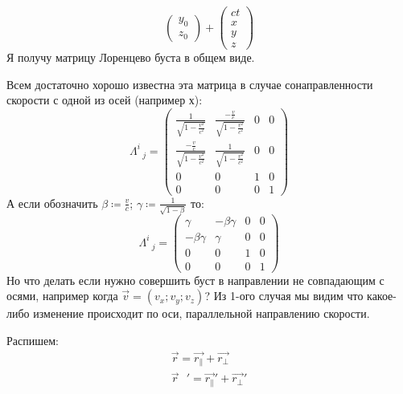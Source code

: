\documentclass[12pt]{article}
\begin{document}
\begin{large}
\begin{equation}
\begin{pmatrix}
            y_0\\
            z_0
        \end{pmatrix}
        +
        \begin{pmatrix}
            ct\\
            x\\
            y\\
            z
        \end{pmatrix}
    \end{equation}
    Я получу матрицу Лоренцево буста в общем виде.
    \par Всем достаточно хорошо известна эта матрица в случае сонаправленности скорости с одной из осей (например х):
    \begin{equation}
        \Lambda^i_{\text{ }j} =
        \begin{pmatrix}
            \frac{1}{\sqrt{1-\frac{v^2}{c^2}}} & \frac{-\frac{v}{c}}{\sqrt{1-\frac{v^2}{c^2}}} & 0 & 0 \\
            \frac{-\frac{v}{c}}{\sqrt{1-\frac{v^2}{c^2}}} & \frac{1}{\sqrt{1-\frac{v^2}{c^2}}} & 0 & 0 \\
            0 & 0 & 1 & 0 \\
            0 & 0 & 0 & 1
        \end{pmatrix}
    \end{equation}
    А если обозначить $\beta \coloneqq \frac{v}{c}$; $\gamma \coloneqq \frac{1}{\sqrt{1 - \beta}}$ то:
    \begin{equation}
        \Lambda^i_{\text{ }j} =
        \begin{pmatrix}
            \gamma & -\beta \gamma & 0 & 0 \\
            -\beta \gamma & \gamma & 0 & 0 \\
            0 & 0 & 1 & 0 \\
            0 & 0 & 0 & 1
        \end{pmatrix}
    \end{equation}
    Но что делать если нужно совершить буст в направлении не совпадающим с осями, например когда $\vec{v} = (v_x; v_y; v_z)$?
    Из 1-ого случая мы видим что какое-либо изменение происходит по оси, параллельной направлению скорости.
    \par Распишем:
    \begin{equation}
    \begin{gathered}
        \vec{r} = \vec{r_{\parallel}} + \vec{r_\perp} \\
        \vec{r}\text{ }' = \vec{r_{\parallel}}' + \vec{r_\perp}'

\end{gathered}
\end{equation}
\end{large}
\end{document}
